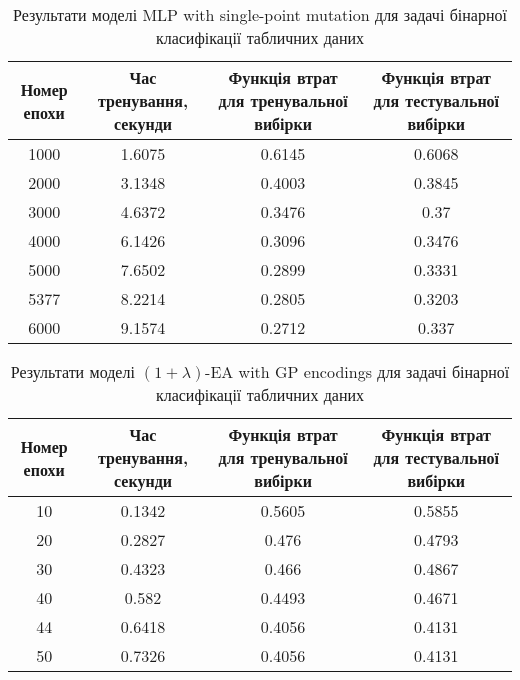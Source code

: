 \begin{table}[ht]
	\caption{Результати моделі MLP with single-point mutation для задачі бінарної класифікації табличних даних}
	\label{mlp_spm_bc_td_results}
	\centering
	\begin{adjustbox}{max width=\textwidth}
		\begin{tabular}{|c|c|c|c|}
			\hline 
			Номер епохи & Час тренування, секунди & Функція втрат для тренувальної вибірки & Функція втрат для тестувальної вибірки \\
			\hline 
			1000 & 1.6075 & 0.6145 & 0.6068 \\
			\hline 
			2000 & 3.1348 & 0.4003 & 0.3845 \\
			\hline
			3000 & 4.6372 & 0.3476 & 0.37 \\
			\hline
			4000 & 6.1426 & 0.3096 & 0.3476 \\
			\hline
			5000 & 7.6502 & 0.2899 & 0.3331 \\
			\hline
			5377 & 8.2214 & 0.2805 & 0.3203 \\
			\hline
			6000 & 9.1574 & 0.2712 & 0.337 \\
			\hline
		\end{tabular}
	\end{adjustbox}
\end{table}

\begin{table}[ht]
	\caption{Результати моделі $(1+\lambda)$-EA with GP encodings для задачі бінарної класифікації табличних даних}
	\label{ea_bc_td_results}
	\centering
	\begin{adjustbox}{max width=\textwidth}
		\begin{tabular}{|c|c|c|c|}
			\hline 
			Номер епохи & Час тренування, секунди & Функція втрат для тренувальної вибірки & Функція втрат для тестувальної вибірки \\
			\hline 
			10 & 0.1342 & 0.5605 & 0.5855 \\
			\hline 
			20 & 0.2827 & 0.476 & 0.4793 \\
			\hline
			30 & 0.4323 & 0.466 & 0.4867 \\
			\hline
			40 & 0.582 & 0.4493 & 0.4671 \\
			\hline
			44 & 0.6418 & 0.4056 & 0.4131 \\
			\hline
			50 & 0.7326 & 0.4056 & 0.4131 \\
			\hline
		\end{tabular}
	\end{adjustbox}
\end{table}

